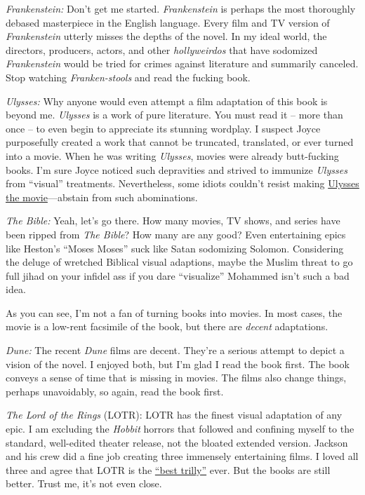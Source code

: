 \emph{Frankenstein:} Don't get me started. \emph{Frankenstein} is
perhaps the most thoroughly debased masterpiece in the English language.
Every film and TV version of \emph{Frankenstein} utterly misses the
depths of the novel. In my ideal world, the directors, producers,
actors, and other \emph{hollyweirdos} that have sodomized
\emph{Frankenstein} would be tried for crimes against literature and
summarily canceled. Stop watching \emph{Franken-stools} and read the
fucking book.

\emph{Ulysses:} Why anyone would even attempt a film adaptation of this
book is beyond me. \emph{Ulysses} is a work of pure literature. You must
read it -- more than once -- to even begin to appreciate its stunning
wordplay. I suspect Joyce purposefully created a work that cannot be
truncated, translated, or ever turned into a movie. When he was writing
\emph{Ulysses}, movies were already butt-fucking books. I'm sure Joyce
noticed such depravities and strived to immunize \emph{Ulysses} from
``visual'' treatments. Nevertheless, some idiots couldn't resist making
\href{https://en.wikipedia.org/wiki/Ulysses_(1967_film)}{Ulysses the movie}---abstain from such abominations.

\emph{The Bible:} Yeah, let's go there. How many movies, TV shows, and
series have been ripped from \emph{The Bible}? How many are any good?
Even entertaining epics like Heston's ``Moses Moses'' suck like Satan
sodomizing Solomon. Considering the deluge of wretched Biblical visual
adaptions, maybe the Muslim threat to go full jihad on your infidel ass
if you dare ``visualize'' Mohammed isn't such a bad idea.

As you can see, I'm not a fan of turning books into movies. In most
cases, the movie is a low-rent facsimile of the book, but there are
\emph{decent} adaptations.

\emph{Dune:} The recent \emph{Dune} films are decent. They're a serious
attempt to depict a vision of the novel. I enjoyed both, but I'm glad I
read the book first. The book conveys a sense of time that is missing in
movies. The films also change things, perhaps unavoidably, so again,
read the book first.

\emph{The Lord of the Rings} (LOTR): LOTR has the finest visual
adaptation of any epic. I am excluding the \emph{Hobbit} horrors that followed
and confining myself to the standard, well-edited theater release, not
the bloated extended version. Jackson and his crew did a fine job
creating three immensely entertaining films. I loved all three and agree
that LOTR is the \href{https://www.nerdsandbeyond.com/2021/12/16/stephen-colbert-friends-crown-the-lord-of-the-rings-as-the-1-trilly/}{``best trilly''} ever. But the books are still better. Trust me, it's not even
close.

